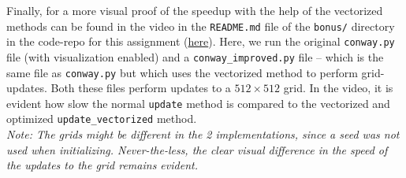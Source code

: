 \documentclass[a4paper,12pt]{article}
\begin{document}
Finally, for a more visual proof of the speedup with the help of the vectorized methods can be found in the video in the \verb|README.md| file of the \verb|bonus/| directory in the code-repo for this assignment (\href{https://github.com/paulmyr/DD2358-HPC25/blob/master/02_hpcds/bonus/README.md}{here}). Here, we run the original \verb|conway.py| file (with visualization enabled) and a \verb|conway_improved.py| file -- which is the same file as \verb|conway.py| but which uses the vectorized method to perform grid-updates. Both these files perform updates to a $512 \times 512$ grid. In the video, it is evident how slow the normal \verb|update| method is compared to the vectorized and optimized \verb|update_vectorized| method. \\
\textit{Note: The grids might be different in the 2 implementations, since a seed was not used when initializing. Never-the-less, the clear visual difference in the speed of the updates to the grid remains evident.}


\end{document}
